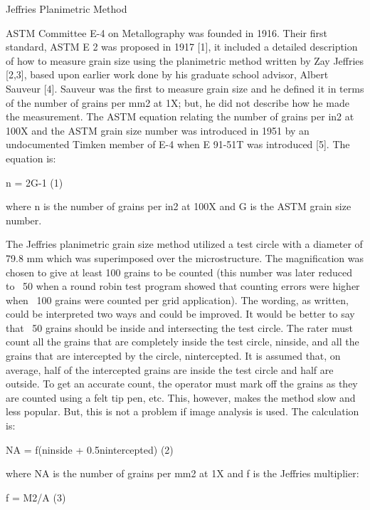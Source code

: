 \documentclass[10pt]{beamer}
\begin{document}
{%
\begin{frame}[fragile]{Jeffries Planimetric Method}

ASTM Committee E-4 on Metallography was founded in 1916. Their first standard, ASTM E 2 was proposed in 1917 [1], it included a detailed description of how to measure grain size using the planimetric method written by Zay Jeffries [2,3], based upon earlier work done by his graduate school advisor, Albert Sauveur [4]. Sauveur was the first to measure grain size and he defined it in terms of the number of grains per mm2 at 1X; but, he did not describe how he made the measurement. The ASTM equation relating the number of grains per in2 at 100X and the ASTM grain size number was introduced in 1951 by an undocumented Timken member of E-4 when E 91-51T was introduced [5]. The equation is:

n = 2G-1                                            (1)

where n is the number of grains per in2 at 100X and G is the ASTM grain size number.

The Jeffries planimetric grain size method utilized a test circle with a diameter of 79.8 mm which was superimposed over the microstructure. The magnification was chosen to give at least 100 grains to be counted (this number was later reduced to ~50 when a round robin test program showed that counting errors were higher when ~100 grains were counted per grid application). The wording, as written, could be interpreted two ways and could be improved. It would be better to say that ~50 grains should be inside and intersecting the test circle. The rater must count all the grains that are completely inside the test circle, ninside, and all the grains that are intercepted by the circle, nintercepted. It is assumed that, on average, half of the intercepted grains are inside the test circle and half are outside. To get an accurate count, the operator must mark off the grains as they are counted using a felt tip pen, etc. This, however, makes the method slow and less popular. But, this is not a problem if image analysis is used. The calculation is:

NA = f(ninside + 0.5nintercepted)                          (2)

where NA is the number of grains per mm2 at 1X and f is the Jeffries multiplier:

f = M2/A                                                     (3)


\end{frame}}
\end{document}
